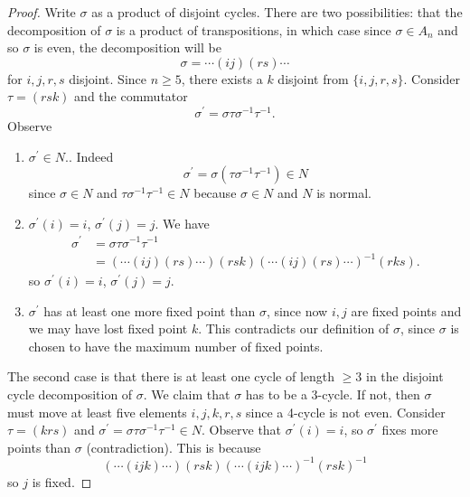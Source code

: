 \begin{proof}
Write $\sigma$ as a product of disjoint cycles. There are two
possibilities: that the decomposition of $\sigma$ is a product of
transpositions, in which case since $\sigma \in A_n$ and so $\sigma$
is even, the decomposition will be
$$
\sigma = \cdots (ij)(rs) \cdots
$$
for $i,j,r,s$ disjoint.  Since $n \geq 5$, there exists a $k$ disjoint
from $\{i,j,r,s\}$. Consider $\tau = (rsk)$ and the commutator
$$
\sigma^\prime = \sigma \tau \sigma^{-1} \tau^{-1}.
$$
Observe
\begin{enumerate}
  \item{
    $\sigma^\prime \in N.$. Indeed
    $$
    \sigma^\prime = \sigma (\tau \sigma^{-1} \tau^{-1}) \in N
    $$
    since $\sigma \in N$ and $\tau \sigma^{-1} \tau^{-1} \in N$
    because $\sigma \in N$ and $N$ is normal.
  }
  \item{
    $\sigma^\prime(i) = i$, $\sigma^\prime(j) = j$. We have
    \begin{align*}
      \sigma^\prime
        &= \sigma \tau \sigma^{-1} \tau^{-1} \\
        &= (\cdots (ij)(rs) \cdots)(rsk)(\cdots (ij)(rs) \cdots)^{-1}(rks).
    \end{align*}
    so $\sigma^\prime(i) = i$, $\sigma^\prime(j) = j$.
  }
  \item{
    $\sigma^\prime$ has at least one more fixed point than $\sigma$,
    since now $i, j$ are fixed points and we may have lost fixed point
    $k$. This contradicts our definition of $\sigma$, since $\sigma$
    is chosen to have the maximum number of fixed points.
  }
\end{enumerate}

The second case is that there is at least one cycle of length $\geq 3$
in the disjoint cycle decomposition of $\sigma$. We claim that
$\sigma$ has to be a 3-cycle. If not, then $\sigma$ must move at
least five elements $i,j,k,r,s$ since a 4-cycle is not even.
Consider $\tau = (krs)$ and $\sigma^\prime = \sigma \tau \sigma^{-1}
\tau^{-1} \in N$. Observe that $\sigma^\prime(i) = i$, so
$\sigma^\prime$ fixes more points than $\sigma$ (contradiction). This
is because
$$
(\cdots(ijk)\cdots)(rsk)(\cdots(ijk)\cdots)^{-1}(rsk)^{-1}
$$
so $j$ is fixed.

\end{proof}
